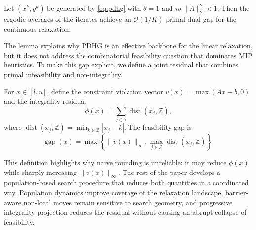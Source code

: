 \begin{lemma}
\label{lem:pdhg}
Let $(x^k, y^k)$ be generated by \eqref{eq:pdhg} with $\theta = 1$ and $\tau \sigma \|A\|_2^2 < 1$. Then the ergodic averages of the iterates achieve an $\mathcal{O}(1/K)$ primal-dual gap for the continuous relaxation.
\end{lemma}

The lemma explains why PDHG is an effective backbone for the linear relaxation, but it does not address the combinatorial feasibility question that dominates MIP heuristics. To make this gap explicit, we define a joint residual that combines primal infeasibility and non-integrality.

\begin{definition}
\label{def:feasibility-gap}
For $x \in [l,u]$, define the constraint violation vector $v(x) = \max(Ax - b, 0)$ and the integrality residual
\begin{equation}
    \phi(x) = \sum_{j \in \mathcal{I}} \operatorname{dist}(x_j, \mathbb{Z}),
\end{equation}
where $\operatorname{dist}(x_j, \mathbb{Z}) = \min_{k \in \mathbb{Z}} |x_j - k|$. The feasibility gap is
\begin{equation}
    \operatorname{gap}(x) = \max \left\{ \|v(x)\|_\infty, \max_{j \in \mathcal{I}} \operatorname{dist}(x_j, \mathbb{Z}) \right\}.
\end{equation}
\end{definition}

This definition highlights why naive rounding is unreliable: it may reduce $\phi(x)$ while sharply increasing $\|v(x)\|_\infty$. The rest of the paper develops a population-based search procedure that reduces both quantities in a coordinated way. Population dynamics improve coverage of the relaxation landscape, barrier-aware non-local moves remain sensitive to search geometry, and progressive integrality projection reduces the residual without causing an abrupt collapse of feasibility.
